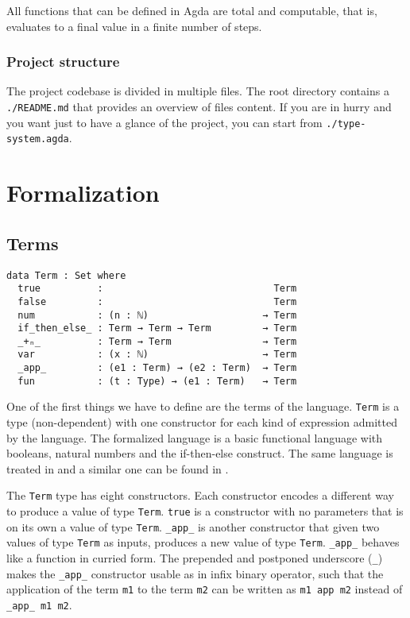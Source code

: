 \documentclass{article}
\begin{document}
All functions that can be defined in Agda are total and computable, that is, evaluates to a final value in a finite number of steps.


\subsubsection*{Project structure}

The project codebase is divided in multiple files.
The root directory contains a \texttt{./README.md} that provides an overview of files content.
If you are in hurry and you want just to have a glance of the project, you can start from \texttt{./type-system.agda}.


\section{Formalization}

\subsection{Terms}

\begin{verbatim}
data Term : Set where
  true          :                              Term
  false         :                              Term
  num           : (n : ℕ)                    → Term
  if_then_else_ : Term → Term → Term         → Term
  _+ₙ_          : Term → Term                → Term
  var           : (x : ℕ)                    → Term
  _app_         : (e1 : Term) → (e2 : Term)  → Term
  fun           : (t : Type) → (e1 : Term)   → Term
\end{verbatim}

One of the first things we have to define are the terms of the language.
\texttt{Term} is a type (non-dependent) with one constructor for each kind of expression admitted by the language.
The formalized language is a basic functional language with booleans, natural numbers and the if-then-else construct.
The same language is treated in \cite[Ch.\ 4]{crafa} and a similar one can be found in \cite[Ch.\ 9]{pierce}.

The \texttt{Term} type has eight constructors.
Each constructor encodes a different way to produce a value of type \texttt{Term}.
\texttt{true} is a constructor with no parameters that is on its own a value of type \texttt{Term}.
\texttt{\_app\_} is another constructor that given two values of type \texttt{Term} as inputs, produces a new value of type \texttt{Term}.
\texttt{\_app\_} behaves like a function in curried form.
The prepended and postponed underscore (\texttt{\_}) makes the \texttt{\_app\_} constructor usable as in infix binary operator, such that the application of the term \texttt{m1} to the term \texttt{m2} can be written as \texttt{m1 app m2} instead of \texttt{\_app\_ m1 m2}.
\end{document}
